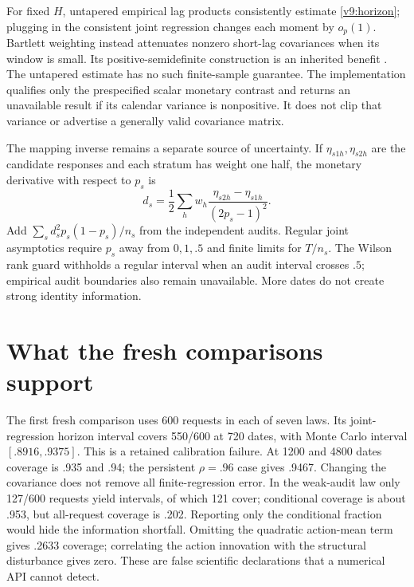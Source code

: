 For fixed $H$, untapered empirical lag products consistently estimate
\eqref{v9:horizon}; plugging in the consistent joint regression changes each
moment by $o_p(1)$. Bartlett weighting instead attenuates nonzero short-lag
covariances when its window is small. Its positive-semidefinite construction
is an inherited benefit \citep[printed p.4, Theorem 1]{newey1986}. The
untapered estimate has no such finite-sample guarantee. The implementation
qualifies only the prespecified scalar monetary contrast and returns an
unavailable result if its calendar variance is nonpositive. It does not clip
that variance or advertise a generally valid covariance matrix.

The mapping inverse remains a separate source of uncertainty. If
$\eta_{s1h},\eta_{s2h}$ are the candidate responses and each stratum has weight
one half, the monetary derivative with respect to $p_s$ is
\[
 d_s=\frac{1}{2}\sum_h w_h
       \frac{\eta_{s2h}-\eta_{s1h}}{(2p_s-1)^2}.
\]
Add $\sum_s d_s^2p_s(1-p_s)/n_s$ from the independent audits. Regular joint
asymptotics require $p_s$ away from $0,1,.5$ and finite limits for $T/n_s$.
The Wilson rank guard withholds a regular interval when an audit interval
crosses $.5$; empirical audit boundaries also remain unavailable. More dates
do not create strong identity information.

\section{What the fresh comparisons support}
\label{v9:results}

The first fresh comparison uses 600 requests in each of seven laws. Its
joint-regression horizon interval covers 550/600 at 720 dates, with Monte
Carlo interval $[.8916,.9375]$. This is a retained calibration failure.
At 1200 and 4800 dates coverage is .935 and .94; the persistent $\rho=.96$
case gives .9467. Changing the covariance does not remove all finite-regression
error. In the weak-audit law only 127/600 requests yield intervals, of which
121 cover; conditional coverage is about .953, but all-request coverage is
.202. Reporting only the conditional fraction would hide the information
shortfall. Omitting the quadratic action-mean term gives .2633 coverage;
correlating the action innovation with the structural disturbance gives zero.
These are false scientific declarations that a numerical API cannot detect.

